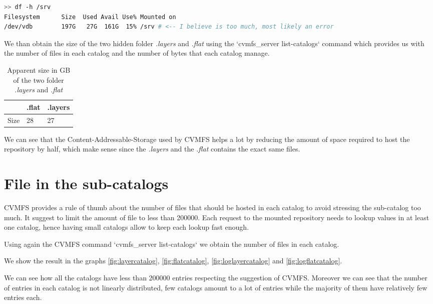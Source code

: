 \begin{minipage}{\linewidth}
\begin{lstlisting}[language=bash,caption={Storage require to store the whole repository},label={lst:data-storage}]
>> df -h /srv
Filesystem      Size  Used Avail Use% Mounted on
/dev/vdb        197G   27G  161G  15% /srv # <-- I believe is too much, most likely an error
\end{lstlisting}
\end{minipage}

We than obtain the size of the two hidden folder \textit{.layers} and
\textit{.flat} using the `cvmfs\_server list-catalogs` command which provides us
with the number of files in each catalog and the number of bytes that each
catalog manage.

\begin{table}[]
\begin{tabular}{|l|ll|}
\hline
     & .flat & .layers \\ \hline
Size & 28    & 27      \\ \hline
\end{tabular}
\caption{Apparent size in GB of the two folder \textit{.layers} and \textit{.flat}}
\label{tab:size-of-repo}
\end{table}

We can see that the Content-Addressable-Storage used by CVMFS helps a lot by
reducing the amount of space required to host the repository by half, which
make sense since the \textit{.layers} and the \textit{.flat} contains the exact
same files.

\section{File in the sub-catalogs}

CVMFS provides a rule of thumb about the number of files that should be hosted
in each catalog to avoid stressing the sub-catalog too much. It suggest to
limit the amount of file to less than 200000. Each request to the mounted
repository needs to lookup values in at least one catalog, hence having small
catalogs allow to keep each lookup fast enough.

Using again the CVMFS command `cvmfs\_server list-catalogs` we obtain the
number of files in each catalog.

We show the result in the graphs \ref{fig:layercatalog}, \ref{fig:flatcatalog},
\ref{fig:loglayercatalog} and \ref{fig:logflatcatalog}.

We can see how all the catalogs have less than 200000 entries respecting the
suggestion of CVMFS. Moreover we can see that the number of entries in each
catalog is not linearly distributed, few catalogs amount to a lot of entries
while the majority of them have relatively few entries each.

